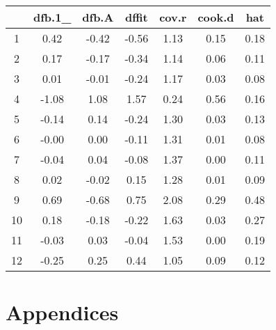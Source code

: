 \documentclass[12pt, a4paper]{report}
\theoremstyle{plain}
\theoremstyle{definition}
\theoremstyle{remark}
\begin{document}



\begin{table}[ht]
\begin{center}
\begin{tabular}{|c|c|c|c|c|c|c|}
  \hline
 & dfb.1\_ & dfb.A & dffit & cov.r & cook.d & hat \\
  \hline
1 & 0.42 & -0.42 & -0.56 & 1.13 & 0.15 & 0.18 \\
  2 & 0.17 & -0.17 & -0.34 & 1.14 & 0.06 & 0.11 \\
  3 & 0.01 & -0.01 & -0.24 & 1.17 & 0.03 & 0.08 \\
  4 & -1.08 & 1.08 & 1.57 & 0.24 & 0.56 & 0.16 \\
  5 & -0.14 & 0.14 & -0.24 & 1.30 & 0.03 & 0.13 \\
  6 & -0.00 & 0.00 & -0.11 & 1.31 & 0.01 & 0.08 \\
  7 & -0.04 & 0.04 & -0.08 & 1.37 & 0.00 & 0.11 \\
  8 & 0.02 & -0.02 & 0.15 & 1.28 & 0.01 & 0.09 \\
  9 & 0.69 & -0.68 & 0.75 & 2.08 & 0.29 & 0.48 \\
  10 & 0.18 & -0.18 & -0.22 & 1.63 & 0.03 & 0.27 \\
  11 & -0.03 & 0.03 & -0.04 & 1.53 & 0.00 & 0.19 \\
  12 & -0.25 & 0.25 & 0.44 & 1.05 & 0.09 & 0.12 \\
   \hline
\end{tabular}
\end{center}
\end{table}



\chapter{Appendices} %
\end{document}
